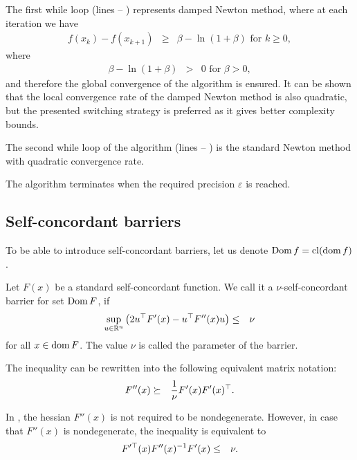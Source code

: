 The first while loop (lines  -- ) represents damped Newton method, where at each iteration we have
\begin{eqnarray}
  f(x_k) - f(x_{k+1}) &\geq& \beta - \ln(1+\beta) \text{ for } k \geq 0,
\end{eqnarray}
where
\begin{eqnarray}
  \beta - \ln(1+\beta) &>& 0 \text{ for } \beta > 0,
\end{eqnarray}
and therefore the global convergence of the algorithm is ensured.
It can be shown that the local convergence rate of the damped Newton method is also quadratic, but the presented switching strategy is preferred as it gives better complexity bounds.

The second while loop of the algorithm (lines  -- ) is the standard Newton method with quadratic convergence rate.

The algorithm terminates when the required precision $\varepsilon$ is reached.


\subsection{Self-concordant barriers}
To be able to introduce self-concordant barriers, let us denote $\operatorname{Dom} f = \operatorname{cl}(\operatorname{dom} f)$.

\begin{definition}
  Let $F(x)$ be a standard self-concordant function. We call it a $\nu$-self-concordant barrier for set $\operatorname{Dom} F$, if
  \begin{eqnarray}
    \sup_{u\in\R^n} \big(2u^\top F'(x) - u^\top F''(x) u\big) &\leq& \nu \labeleq{SDP:scb:def}
  \end{eqnarray}
  for all $x\in\operatorname{dom} F$. The value $\nu$ is called the parameter of the barrier.
\end{definition}

The inequality  can be rewritten into the following equivalent matrix notation:
\begin{eqnarray}
  F''(x) &\succeq& \frac{1}{\nu}F'(x)F'(x)^\top.\labeleq{SDP:scb:def1}
\end{eqnarray}

In , the hessian $F''(x)$ is not required to be nondegenerate. However, in case that $F''(x)$ is nondegenerate, the inequality  is equivalent to
\begin{eqnarray}
  F'^\top(x)F''(x)^{-1}F'(x) &\leq& \nu.\labeleq{SDP:scb:def2}
\end{eqnarray}

